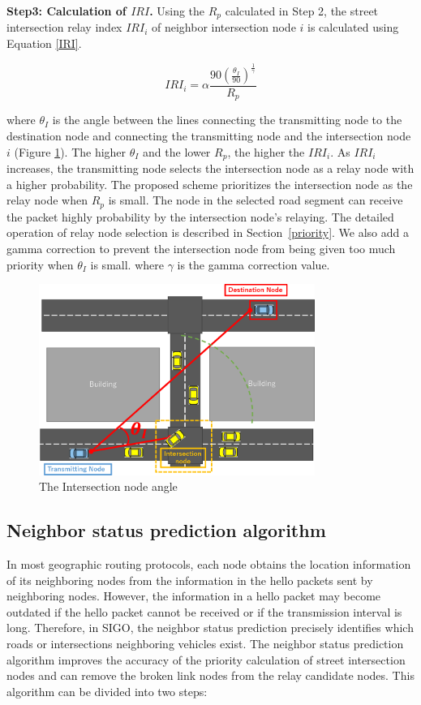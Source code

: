 \documentclass[conference]{IEEEtran}
\begin{document}
\textbf{Step3: Calculation of $IRI$.}
Using the $R_p$ calculated in Step 2, the street intersection relay  index $IRI_i$ of neighbor intersection node $i$ is calculated using Equation \ref{IRI}.

\begin{equation}
\label{IRI}
IRI_i = \alpha\frac{90\left(\frac{\theta_I}{90}\right)^\frac{1}{{\gamma}}}{R_p}
\end{equation}

where $\theta_I$ is the angle between the lines connecting the transmitting node to the destination node and  connecting the transmitting node and the intersection node $i$ (Figure \ref{fig:intersection_angle}).
The higher $\theta_I$  and the lower  $R_p$, the higher the $IRI_i$.
As $IRI_i$ increases, the transmitting node selects the intersection node as a relay node with a higher probability. 
The proposed scheme prioritizes the intersection node as the relay node when $R_p$ is small. The node in the selected road segment can receive the packet highly probability by the intersection node's relaying.
The detailed operation of relay node selection is described in \mbox{Section \ref{priority}}.
We also add a gamma correction to prevent the intersection node from being given too much priority when $\theta_I$ is small.
where $\gamma$ is the gamma correction value.


\begin{figure}[!ht]
\centering
\includegraphics[width=90mm]{figures/Intersection_angle.eps}
\caption{The Intersection node angle}
\label{fig:intersection_angle}
\end{figure}


\subsection{Neighbor status prediction algorithm}
\label{neighbor_status}
In most geographic routing protocols, each node obtains the location information of its neighboring nodes from the  information in the hello packets sent by neighboring nodes.
However, the information in a hello packet may become outdated if the hello packet cannot be received or if the transmission interval is long.
Therefore, in SIGO, the neighbor status prediction precisely identifies which roads or intersections neighboring vehicles exist. 
The neighbor status prediction algorithm improves the accuracy of the priority calculation of street intersection nodes and can remove the broken link nodes from the relay candidate nodes. This algorithm can be divided into two steps:
\end{document}
